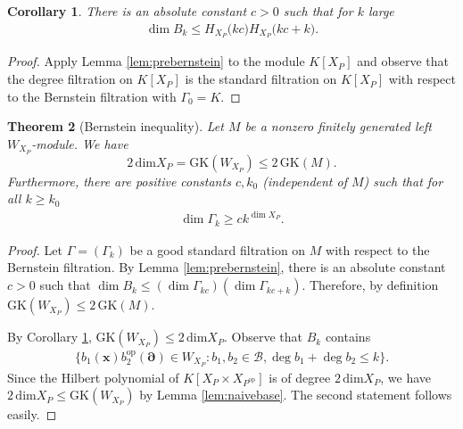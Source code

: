 \documentclass[11pt,a4paper,usenames,dvipsnames,reqno]{amsart}
\numberwithin{equation}{section}
\newcommand{\qq}{\mathbb Q}
\newtheorem{Thm}{Theorem}[section]
\newtheorem{Cor}[Thm]{Corollary}
\theoremstyle{definition}
\theoremstyle{remark}
\begin{document}
\begin{Cor}\label{cor:polygrowth}
There is an absolute constant $c>0$ such that for $k$ large
\begin{align*}
    \dim B_k\le H_{X_P}\big(kc\big)H_{X_P}\big(kc+k\big).
\end{align*}
\end{Cor}

\begin{proof}
Apply Lemma \ref{lem:prebernstein} to the module $K[X_P]$ and observe that the degree filtration on $K[X_P]$ is the standard filtration on $K[X_P]$ with respect to the Bernstein filtration with $\Gamma_0=K$. 
\end{proof}

\begin{Thm}[Bernstein inequality]\label{thm:Bernstein}
Let $M$ be a nonzero finitely generated left $W_{X_P}$-module. We have $$2\,\mathrm{dim} X_P=\mathrm{GK}(W_{X_P})\le2 \, \mathrm{GK}(M) .$$ 
 Furthermore, there are positive constants $c,k_0$ (independent of $M$) such that for all $k\ge k_0$
\begin{align*}
    \dim \Gamma_{k}\ge ck^{\dim X_P}.
\end{align*}
\end{Thm}

\begin{proof}
 Let $\Gamma=(\Gamma_k)$ be a good standard filtration on $M$ with respect to the Bernstein filtration. By Lemma \ref{lem:prebernstein}, there is an absolute constant $c>0$ such that $\dim B_k\le (\dim \Gamma_{kc}) (\dim \Gamma_{kc+k})$. Therefore, by definition $\mathrm{GK}(W_{X_P})\le 2 \, \mathrm{GK}(M).$ 
 
 By Corollary \ref{cor:polygrowth}, $\mathrm{GK}(W_{X_P})\le 2\,\mathrm{dim} X_P$. Observe that $B_k$ contains
\begin{align*}
    \{ b_1(\mathbf{x})b_2^{\mathrm{op}}(\mathbf{\partial})\in W_{X_P}: b_1,b_2\in \mathcal{B}, \deg b_1+\deg b_2\le k\}.
\end{align*}
Since the Hilbert polynomial of $K[X_P\times X_{P^\mathrm{op}}]$ is of degree $2\, \mathrm{dim} X_P$, we have $2\,\mathrm{dim} X_P\le \mathrm{GK}(W_{X_P})$ by Lemma \ref{lem:naivebase}. The second statement follows easily.
\end{proof}
\end{document}
